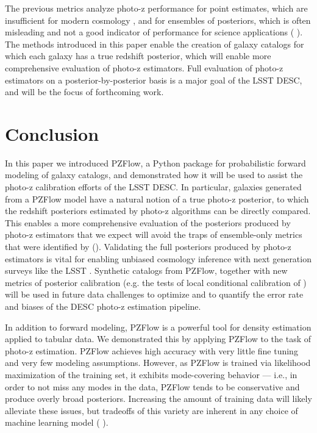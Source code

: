 \documentclass[twocolumn,twocolappendix]{aastex631}
\newcommand{\citePZp}{(\citetalias{schmidt2020} \citeyear{schmidt2020})\xspace}
\newcommand{\citePZt}{\citetalias{schmidt2020} (\citeyear{schmidt2020})\xspace}
\begin{document}
The previous metrics analyze photo-z performance for point estimates, which are insufficient for modern cosmology \citep{newman2022}, and for ensembles of posteriors, which is often misleading and not a good indicator of performance for science applications \citePZp.
The methods introduced in this paper enable the creation of galaxy catalogs for which each galaxy has a true redshift posterior, which will enable more comprehensive evaluation of photo-z estimators.
Full evaluation of photo-z estimators on a posterior-by-posterior basis is a major goal of the LSST DESC, and will be the focus of forthcoming work.


\section{Conclusion}
\label{sec:conclusion}

In this paper we introduced PZFlow, a Python package for probabilistic forward modeling of galaxy catalogs, and demonstrated how it will be used to assist the photo-z calibration efforts of the LSST DESC.
In particular, galaxies generated from a PZFlow model have a natural notion of a true photo-z posterior, to which the redshift posteriors estimated by photo-z algorithms can be directly compared.
This enables a more comprehensive evaluation of the posteriors produced by photo-z estimators that we expect will avoid the traps of ensemble-only metrics that were identified by \citePZt.
Validating the full posteriors produced by photo-z estimators is vital for enabling unbiased cosmology inference with next generation surveys like the LSST \citep{newman2022}.
Synthetic catalogs from PZFlow, together with new metrics of posterior calibration (e.g. the tests of local conditional calibration of \citealt{dey2021b, dey2022}) will be used in future data challenges to optimize and to quantify the error rate and biases of the DESC photo-z estimation pipeline.

In addition to forward modeling, PZFlow is a powerful tool for density estimation applied to tabular data.
We demonstrated this by applying PZFlow to the task of photo-z estimation.
PZFlow achieves high accuracy with very little fine tuning and very few modeling assumptions.
However, as PZFlow is trained via likelihood maximization of the training set, it exhibits mode-covering behavior --- i.e., in order to not miss any modes in the data, PZFlow tends to be conservative and produce overly broad posteriors.
Increasing the amount of training data will likely alleviate these issues, but tradeoffs of this variety are inherent in any choice of machine learning model \citePZp.
\end{document}

